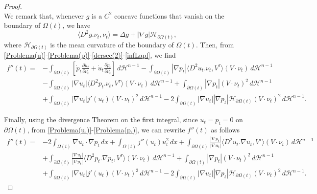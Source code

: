 \documentclass[10pt,a4paper]{amsart}
\newcommand{\abs}[1]{{\left|#1\right|}}
\begin{document}
\begin{proof}
\begin{equation}
\end{equation}
We remark that, whenever $g$ is a $C^2$ concave functions that vanish on the boundary of $\Omega(t)$, we have
\begin{equation}\label{infLapl}
    \langle D^2g.\nu_t,\nu_t\rangle=\Delta g+\abs{\nabla g}\mathscr{H}_{\partial\Omega(t)},
\end{equation}
where $\mathscr{H}_{\partial\Omega(t)}$ is the mean curvature of the boundary of $\Omega(t)$. Then, from \eqref{Problema(u)}-\eqref{Problema(p)}-\eqref{dersec(2)}-\eqref{infLapl}, we find
\begin{equation*}
    \begin{split}
        f''(t)=&-\int_{\partial\Omega(t)}\left[\dot{p}_t\frac{\partial\dot{u}_t}{\partial\nu_t}+\dot{u}_t\frac{\partial\dot{p}_t}{\partial\nu_t} \right]\,d\mathcal{H}^{n-1}-\int_{\partial\Omega(t)}\abs{\nabla p_t}\langle D^2u_t.\nu_t,V^\tau\rangle(V\cdot\nu_t)\,d\mathcal{H}^{n-1}\\
        &-\int_{\partial\Omega(t)}\abs{\nabla u_t}\langle D^2p_t.\nu_t,V^\tau\rangle(V\cdot\nu_t)\,d\mathcal{H}^{n-1}+\int_{\partial\Omega(t)}\abs{\nabla p_t}(V\cdot\nu_t)^2\,d\mathcal{H}^{n-1}\\
        &+\int_{\partial\Omega(t)}\abs{\nabla u_t}j'(u_t)(V\cdot\nu_t)^2\,d\mathcal{H}^{n-1}-2\int_{\partial\Omega(t)}\abs{\nabla u_t}\abs{\nabla p_t}\mathscr{H}_{\partial\Omega(t)}(V\cdot\nu_t)^2\,d\mathcal{H}^{n-1}.
    \end{split}
\end{equation*}

Finally, using the divergence Theorem on the first integral, since $u_t=p_t=0$ on $\partial\Omega(t)$, from \eqref{Problema(u.)}-\eqref{Problema(p.)}, we can rewrite $f''(t)$ as follows
\begin{equation*}
    \begin{split}
        f''(t)=&-2\int_{\Omega(t)}\nabla \dot{u}_t\cdot\nabla\dot{p}_t \,dx+\int_{\Omega(t)}j''(u_t)\dot{u}_t^2\,dx+\int_{\partial\Omega(t)}\frac{\abs{\nabla p_t}}{\abs{\nabla u_t}}\langle D^2u_t.\nabla u_t,V^\tau\rangle(V\cdot\nu_t)\,d\mathcal{H}^{n-1}\\
        &+\int_{\partial\Omega(t)}\frac{\abs{\nabla u_t}}{\abs{\nabla p_t}}\langle D^2p_t.\nabla p_t,V^\tau\rangle(V\cdot\nu_t)\,d\mathcal{H}^{n-1}+\int_{\partial\Omega(t)}\abs{\nabla p_t}(V\cdot\nu_t)^2\,d\mathcal{H}^{n-1}\\
        &+\int_{\partial\Omega(t)}\abs{\nabla u_t}j'(u_t)(V\cdot\nu_t)^2\,d\mathcal{H}^{n-1}-2\int_{\partial\Omega(t)}\abs{\nabla u_t}\abs{\nabla p_t}\mathscr{H}_{\partial\Omega(t)}(V\cdot\nu_t)^2\,d\mathcal{H}^{n-1}.
    \end{split}
\end{equation*}
\end{proof}
\end{document}
